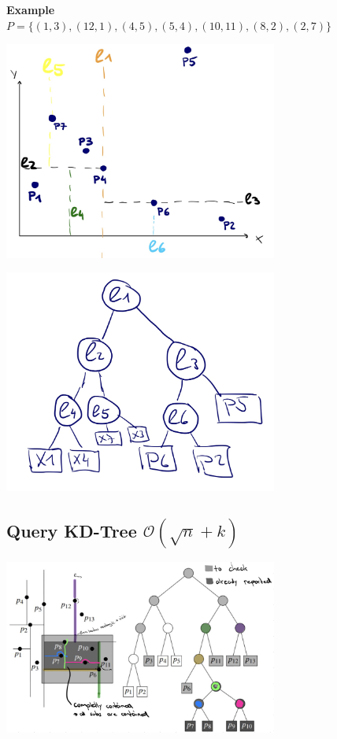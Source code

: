 \documentclass[10pt,a4paper,twocolumn]{article}
\begin{document}
\textbf{Example}\\
$P = \{(1,3),(12,1),(4,5),(5,4),(10,11),(8,2),(2,7)\}$

\begin{center}
	\includegraphics[width=9cm]{images/kd-tree-example1}
\end{center}

\begin{center}
	\includegraphics[width=9cm]{images/kd-tree-example2}
\end{center}



\subsection{Query KD-Tree $\mathcal{O}(\sqrt{n}+k)$}
\begin{center}
	\includegraphics[width=9cm]{images/query-kdtree-example}
\end{center}
\end{document}
